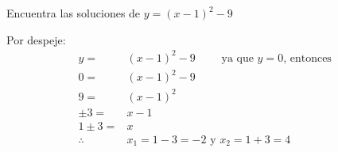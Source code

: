 Encuentra las soluciones de $y=(x-1)^2-9$

\begin{solutionbox}{5cm}
    Por despeje:
    \begin{align*}
        y=         & (x-1)^2-9 \qquad \text{ ya que $y=0$, entonces } \\
        0=         & (x-1)^2-9                                        \\
        9=         & (x-1)^2                                          \\
        \pm 3=     & x-1                                              \\
        1 \pm 3=   & x                                                \\
        \therefore & x_1=1-3 =-2 \text{ y } x_2=1+3=4
    \end{align*}
\end{solutionbox}
